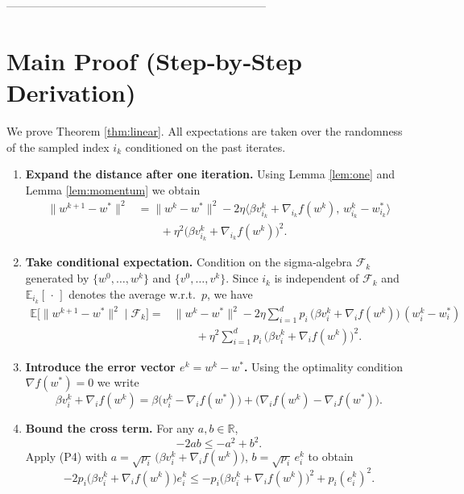 \documentclass{article}
\newcommand{\E}{\mathbb{E}}
\newcommand{\R}{\mathbb{R}}
\begin{document}
---------------------------------------------------------------------

\section*{Main Proof (Step‑by‑Step Derivation)}
We prove Theorem \ref{thm:linear}.  
All expectations are taken over the randomness of the sampled index $i_k$
conditioned on the past iterates.

\begin{enumerate}[label=[Step \arabic*], leftmargin=*]
\item \textbf{Expand the distance after one iteration.}  
Using Lemma \ref{lem:one} and Lemma \ref{lem:momentum} we obtain
\[
\begin{aligned}
\|w^{k+1}-w^{*}\|^{2}
&= \|w^{k}-w^{*}\|^{2}
-2\eta\langle \beta v_{i_k}^{k}+ \nabla_{i_k}f(w^{k}),\, w^{k}_{i_k}-w^{*}_{i_k}\rangle\\
&\qquad +\eta^{2}\bigl(\beta v_{i_k}^{k}+ \nabla_{i_k}f(w^{k})\bigr)^{2}.
\end{aligned}
\tag{P1}
\]

\item \textbf{Take conditional expectation.}  
Condition on the sigma‑algebra $\mathcal{F}_{k}$ generated by
$\{w^{0},\dots,w^{k}\}$ and $\{v^{0},\dots,v^{k}\}$.
Since $i_k$ is independent of $\mathcal{F}_{k}$ and $\E_{i_k}[\,\cdot\,]$ denotes
the average w.r.t.\ $p$, we have
\[
\begin{aligned}
\E\!\bigl[\|w^{k+1}-w^{*}\|^{2}\mid\mathcal{F}_{k}\bigr]
=&\|w^{k}-w^{*}\|^{2}
-2\eta\sum_{i=1}^{d}p_i\,
\bigl(\beta v_{i}^{k}+ \nabla_i f(w^{k})\bigr)\,(w^{k}_{i}-w^{*}_{i})\\
&\qquad+\eta^{2}\sum_{i=1}^{d}p_i\,
\bigl(\beta v_{i}^{k}+ \nabla_i f(w^{k})\bigr)^{2}.
\end{aligned}
\tag{P2}
\]

\item \textbf{Introduce the error vector $e^{k}=w^{k}-w^{*}$.}
Using the optimality condition $\nabla f(w^{*})=0$ we write
\[
\beta v_{i}^{k}+ \nabla_i f(w^{k})
= \beta\bigl(v_{i}^{k}-\nabla_i f(w^{*})\bigr)
+ \bigl(\nabla_i f(w^{k})-\nabla_i f(w^{*})\bigr).
\tag{P3}
\]

\item \textbf{Bound the cross term.}  
For any $a,b\in\R$,
\[
-2ab\le -a^{2}+b^{2}.
\tag{P4}
\]
Apply (P4) with
$a=\sqrt{p_i}\,\bigl(\beta v_{i}^{k}+ \nabla_i f(w^{k})\bigr)$,
$b=\sqrt{p_i}\,e^{k}_{i}$ to obtain
\[
-2p_i\bigl(\beta v_{i}^{k}+ \nabla_i f(w^{k})\bigr)e^{k}_{i}
\le -p_i\bigl(\beta v_{i}^{k}+ \nabla_i f(w^{k})\bigr)^{2}
+ p_i (e^{k}_{i})^{2}.
\tag{P5}
\]


\end{enumerate}
\end{document}

